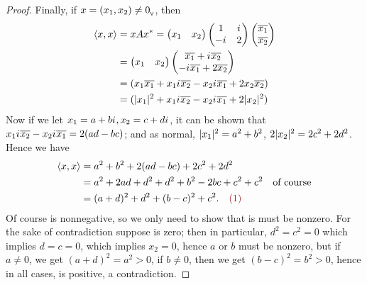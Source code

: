 \begin{proof}
Finally, if \(x = (x_1, x_2) \ne 0_{_{\textsf{V}}}\), then
\begin{align*}
    \left< x, x \right> & = x A x^*
        = \begin{pmatrix} x_1 & x_2 \end{pmatrix}
          \begin{pmatrix} 1 & {i\mkern1mu} \\ -{i\mkern1mu} & 2 \end{pmatrix}
          \begin{pmatrix} \overline{x_1} \\ \overline{x_2} \end{pmatrix} \\
        & = \begin{pmatrix} x_1 & x_2 \end{pmatrix}
            \begin{pmatrix} \overline{x_1} + {i\mkern1mu} \overline{x_2} \\ -{i\mkern1mu} \overline{x_1} + 2\overline{x_2} \end{pmatrix} \\
        & = (x_1 \overline{x_1} + x_1 {i\mkern1mu} \overline{x_2} - x_2 {i\mkern1mu} \overline{x_1} + 2 x_2 \overline{x_2}) \\
        & = (\lvert x_1\rvert^2 + x_1 {i\mkern1mu} \overline{x_2} - x_2 {i\mkern1mu} \overline{x_1} + 2 \lvert x_2\rvert^2)
\end{align*}
Now if we let \(x_1 = a + b {i\mkern1mu}, x_2 = c + d {i\mkern1mu}\), it can be shown that \(x_1 {i\mkern1mu} \overline{x_2} - x_2 {i\mkern1mu} \overline{x_1} = 2(ad - bc)\); and as normal, \(\lvert x_1\rvert^2 = a^2 + b^2\), \(2 \lvert x_2\rvert^2 = 2c^2 + 2d^2\).
Hence we have
\begin{align*}
    \LG x, x \RG & = a^2 + b^2 + 2(ad - bc) + 2c^2 + 2d^2 \\
        & = a^2 + 2ad + d^2 + d^2 + b^2 - 2bc + c^2 + c^2 & \text{of course} \\
        & = (a + d)^2 + d^2 + (b - c)^2 + c^2. \quad \MAROON{(1)}
\end{align*}
Of course  is nonnegative, so we only need to show that is must be nonzero.
For the sake of contradiction suppose  is zero; then in particular, \(d^2 = c^2 = 0\) which implies \(d = c = 0\), which implies \(x_2 = 0\), hence \(a\) or \(b\) must be nonzero, but if \(a \ne 0\), we get \((a + d)^2 = a^2 > 0\), if \(b \ne 0\), then we get \((b - c)^2 = b^2 > 0\), hence in all cases,  is positive, a contradiction.


\end{proof}
